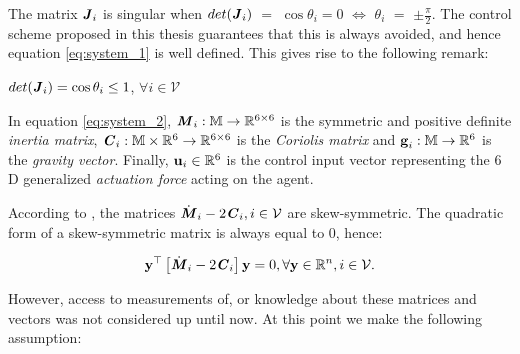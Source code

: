 The matrix $\bm{\mathit{J}}_i$ is singular when $det(\bm{\mathit{J}}_i)$ $=$ $\cos\theta_i = 0$
$\Leftrightarrow$ $\theta_i$ $=$ $\pm \frac{\pi}{2}$. The control scheme
proposed in this thesis guarantees that this is always avoided, and hence
equation \eqref{eq:system_1} is well defined. This gives rise to the following
remark:

\begin{bw_box}
  \begin{remark}
    $det(\bm{\mathit{J}}_i) = \cos\theta_i \leq 1$, $\forall i \in \mathcal{V}$
  \end{remark}
\end{bw_box}



In equation \eqref{eq:system_2}, $\bm{\mathit{M}}_i:\mathbb{M} \to \mathbb{R}^{6\times6}$ is
the symmetric and positive definite \textit{inertia matrix},
$\bm{\mathit{C}}_i:\mathbb{M}\times\mathbb{R}^6 \to \mathbb{R}^{6\times6}$ is the
\textit{Coriolis matrix} and $\bm{\mathbf{g}}_i:\mathbb{M} \to \mathbb{R}^6$ is the
\textit{gravity vector}.
Finally, $\bm{\mathbf{u}}_i\in\mathbb{R}^6$ is the control input vector representing
the $6$D generalized \textit{actuation force} acting on the agent.



\begin{bw_box}
  \begin{remark}
    According to \cite{Murray:1994:MIR:561828}, the matrices
    $\dot{\bm{\mathit{M}}}_i - 2\bm{\mathit{C}}_i, i \in \mathcal{V}$ are skew-symmetric.
    The quadratic form of a skew-symmetric matrix is always equal to 0, hence:

    \begin{equation}
      \bm{\mathbf{y}}^\top \left[\dot{\bm{\mathit{M}}}_i - 2 \bm{\mathit{C}}_i\right]\bm{\mathbf{y}} = 0,
        \forall \bm{\mathbf{y}} \in \mathbb{R}^n, i \in \mathcal{V}.
    \label{eq:skew_symm}
    \end{equation}
  \end{remark}
\end{bw_box}

However, access to measurements of, or knowledge about these matrices and
vectors was not considered up until now. At this point we make the following
assumption:

